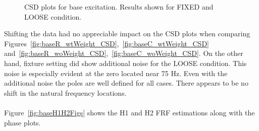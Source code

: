 \documentclass[paper=a4, fontsize=12pt]{scrartcl} %
\begin{document}
	\begin{figure}[H]
		\centering
		\quad
		\quad
		\quad
		\caption{CSD plots for base excitation. Results shown for FIXED and LOOSE 					condition.}
		\label{fig:baseCSDFigs}
	\end{figure}
%
Shifting the data had no appreciable impact on the CSD plots when comparing Figures~\ref{fig:baseR_wtWeight_CSD},~\ref{fig:baseC_wtWeight_CSD} and~\ref{fig:baseR_woWeight_CSD},~\ref{fig:baseC_woWeight_CSD}. On the other hand, fixture setting did show additional noise for the LOOSE condition. This noise is especially evident at the zero located near 75 Hz. Even with the additional noise the poles are well defined for all cases. There appears to be no shift in the natural frequency locations.
\\
\\
Figure~\ref{fig:baseH1H2Figs} shows the H1 and H2 FRF estimations along with the phase plots.
\end{document}
